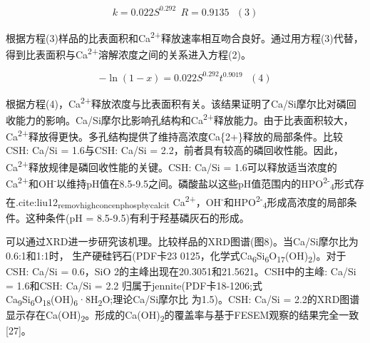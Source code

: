 \documentclass[11pt]{article}
\begin{document}
\[k = 0.022S^{0.292} \ \ R = 0.9135 \ \ \ (3)\]

\setlength{\parindent}{1.0cm}
根据方程(3)样品的比表面积和Ca\textsuperscript{2+}释放速率相互吻合良好。通过用方程(3)代替，得到比表面积与Ca\textsuperscript{2+}溶解浓度之间的关系进入方程(2)。
\par

\[-\ln(1-x) = 0.022S^{0.292}t^{0.9019} \ \ \ (4)\]

\setlength{\parindent}{1.0cm}
根据方程(4)，Ca\textsuperscript{2+}释放浓度与比表面积有关。该结果证明了Ca/Si摩尔比对磷回收能力的影响。Ca/Si摩尔比影响孔结构和Ca\textsuperscript{2+}释放能力。由于比表面积较大，Ca\textsuperscript{2+}释放得更快。多孔结构提供了维持高浓度Ca\{2+\}释放的局部条件。比较CSH: Ca/Si = 1.6与CSH: Ca/Si = 2.2，前者具有较高的磷回收性能。因此，Ca\textsuperscript{2+}释放规律是磷回收性能的关键。CSH: Ca/Si = 1.6可以释放适当浓度的Ca\textsuperscript{2+}和OH\textsuperscript{-}以维持pH值在8.5-9.5之间。磷酸盐以这些pH值范围内的HPO\textsuperscript{2-}\textsubscript{4}形式存在.cite:liu12\textsubscript{remov}\textsubscript{high}\textsubscript{concen}\textsubscript{phosp}\textsubscript{by}\textsubscript{calcit} Ca\textsuperscript{2+}，OH\textsuperscript{-}和HPO\textsuperscript{2-}\textsubscript{4}形成高浓度的局部条件。这种条件(pH = 8.5-9.5)有利于羟基磷灰石的形成。
\par

\setlength{\parindent}{1.0cm}
可以通过XRD进一步研究该机理。比较样品的XRD图谱(图8)。当Ca/Si摩尔比为0.6:1和1:1时，
生产硬硅钙石(PDF卡23 0125，化学式Ca\textsubscript{6}Si\textsubscript{6}O\textsubscript{17}(OH)\textsubscript{2})。对于CSH: Ca/Si =
0.6，SiO 2的主峰出现在20.3051和21.5621。CSH中的主峰: Ca/Si = 1.6和CSH: Ca/Si = 2.2
归属于jennite(PDF卡18-1206;式Ca\textsubscript{9}Si\textsubscript{6}O\textsubscript{18}(OH)\textsubscript{6}·8H\textsubscript{2}O;理论Ca/Si摩尔比
为1.5)。CSH: Ca/Si = 2.2的XRD图谱显示存在Ca(OH)\textsubscript{2}。形成的Ca(OH)\textsubscript{2}的覆盖率与基于FESEM观察的结果完全一致[27]。
\par
\end{document}
